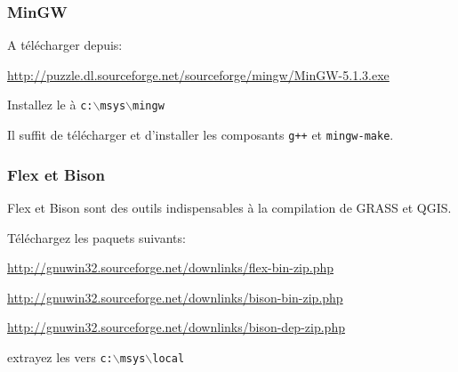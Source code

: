 \subsubsection{MinGW}
A t\'el\'echarger depuis:

\url{http://puzzle.dl.sourceforge.net/sourceforge/mingw/MinGW-5.1.3.exe}

Installez le \`a \texttt{c:$\backslash$msys$\backslash$mingw}

Il suffit de t\'el\'echarger et d'installer les composants \texttt{g++} et \texttt{mingw-make}.

% 
% 
% 
% 
% 

\subsubsection{Flex et Bison}
Flex et Bison sont des outils indispensables \`a la compilation de GRASS et QGIS. 

T\'el\'echargez les paquets suivants:

\url{http://gnuwin32.sourceforge.net/downlinks/flex-bin-zip.php}

\url{http://gnuwin32.sourceforge.net/downlinks/bison-bin-zip.php}

\url{http://gnuwin32.sourceforge.net/downlinks/bison-dep-zip.php}

extrayez les vers \texttt{c:$\backslash$msys$\backslash$local}

